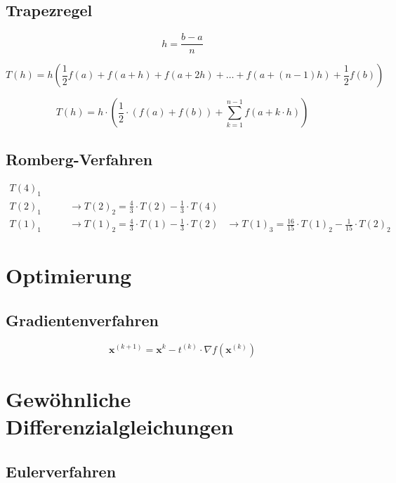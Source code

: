 \documentclass[a4paper, twoside]{article}
\begin{document}
\subsection{Trapezregel}

\[h = \frac{b-a}{n}\]

\[T(h) = h\left(\frac{1}{2}f(a) + f(a+h) + f(a+2h) + \ldots + f(a + (n-1)h) + \frac{1}{2}f(b)\right)\]

\[T(h) = h \cdot \left( \frac{1}{2} \cdot (f(a) + f(b)) + \sum_{k=1}^{n-1} f(a + k \cdot h)\right)\]


\subsection{Romberg-Verfahren}

\begin{align*}
  T(4)_{1} &&\\
  T(2)_{1} & \qquad\rightarrow T(2)_{2} = \frac{4}{3} \cdot T(2) - \frac{1}{3} \cdot T(4) &&\\
  T(1)_{1} & \qquad\rightarrow T(1)_{2} = \frac{4}{3} \cdot T(1) - \frac{1}{3} \cdot T(2) & \rightarrow T(1)_{3} = \frac{16}{15} \cdot T(1)_{2} - \frac{1}{15} \cdot T(2)_{2}
\end{align*}

\section{Optimierung}

\subsection{Gradientenverfahren}

\[\mathbf{x}^{(k+1)} = \mathbf{x}^{k} - t^{(k)} \cdot \nabla f\left(\mathbf{x}^{(k)}\right)\]

\section{Gewöhnliche Differenzialgleichungen}

\subsection{Eulerverfahren}
\end{document}
